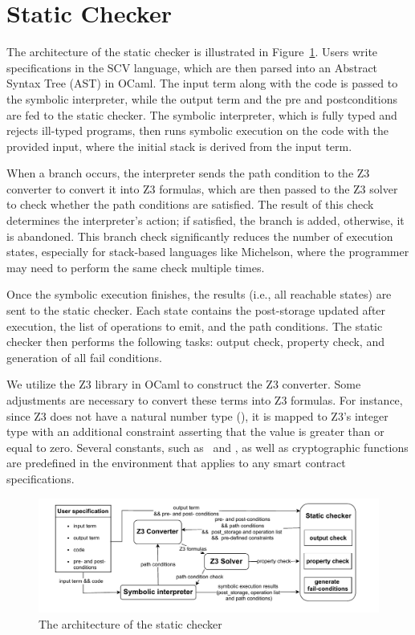 \documentclass[runningheads]{llncs}
\begin{document}
\section{Static Checker}
\label{sec:static-checker-we}
The architecture of the static checker is illustrated in Figure~\ref{fig:architecture-of-static-checker}. Users write specifications in the SCV language, which are then parsed into an Abstract Syntax Tree (AST) in OCaml. The input term along with the code is passed to the symbolic interpreter, while the output term and the pre and postconditions are fed to the static checker. The symbolic interpreter, which is fully typed and rejects ill-typed programs, then runs symbolic execution on the code with the provided input, where the initial stack is derived from the input term.

When a branch occurs, the interpreter sends the path condition to the Z3 converter to convert it into Z3 formulas, which are then passed to the Z3 solver to check whether the path conditions are satisfied. The result of this check determines the interpreter's action; if satisfied, the branch is added, otherwise, it is abandoned. This branch check significantly reduces the number of execution states, especially for stack-based languages like Michelson, where the programmer may need to perform the same check multiple times.

Once the symbolic execution finishes, the results (i.e., all reachable states) are sent to the static checker. Each state contains the post-storage updated after execution, the list of operations to emit, and the path conditions. The static checker then performs the following tasks: output check, property check, and generation of all fail conditions.

We utilize the Z3 library in OCaml to construct the Z3 converter. Some adjustments are necessary to convert these terms into Z3 formulas. For instance, since Z3 does not have a natural number type (\TNAT), it is mapped to Z3's integer type with an additional constraint asserting that the value is greater than or equal to zero. Several constants, such as \CAMOUNT\ and \CBALANCE, as well as cryptographic functions are predefined in the environment that applies to any smart contract specifications.

\begin{figure}[tp]
    \centering
    \includegraphics[width=1\textwidth]{scv}
    \caption{The architecture of the static checker}
    \label{fig:architecture-of-static-checker}
\end{figure}
\end{document}
